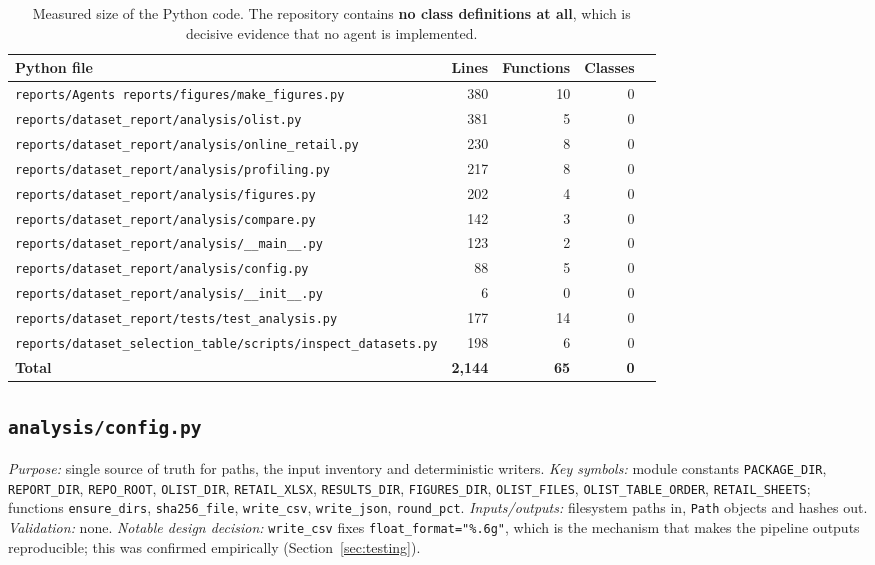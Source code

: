 \documentclass[11pt,a4paper]{article}
\newcommand{\code}[1]{\texttt{#1}}
\begin{document}
\begin{table}[H]
\centering
\small
\begin{tabular}{L{8.4cm}rrrr}
\toprule
\textbf{Python file} & \textbf{Lines} & \textbf{Functions} & \textbf{Classes} \\
\midrule
\code{reports/Agents reports/figures/make\_figures.py} & 380 & 10 & 0 \\
\code{reports/dataset\_report/analysis/olist.py} & 381 & 5 & 0 \\
\code{reports/dataset\_report/analysis/online\_retail.py} & 230 & 8 & 0 \\
\code{reports/dataset\_report/analysis/profiling.py} & 217 & 8 & 0 \\
\code{reports/dataset\_report/analysis/figures.py} & 202 & 4 & 0 \\
\code{reports/dataset\_report/analysis/compare.py} & 142 & 3 & 0 \\
\code{reports/dataset\_report/analysis/\_\_main\_\_.py} & 123 & 2 & 0 \\
\code{reports/dataset\_report/analysis/config.py} & 88 & 5 & 0 \\
\code{reports/dataset\_report/analysis/\_\_init\_\_.py} & 6 & 0 & 0 \\
\code{reports/dataset\_report/tests/test\_analysis.py} & 177 & 14 & 0 \\
\code{reports/dataset\_selection\_table/scripts/inspect\_datasets.py} & 198 & 6 & 0 \\
\midrule
\textbf{Total} & \textbf{2{,}144} & \textbf{65} & \textbf{0} \\
\bottomrule
\end{tabular}
\caption{Measured size of the Python code. The repository contains \textbf{no class definitions at all}, which is decisive evidence that no agent is implemented.}
\label{tab:inventory}
\end{table}

\subsection{\code{analysis/config.py}}
\textit{Purpose:} single source of truth for paths, the input inventory and deterministic writers. \textit{Key symbols:} module constants \code{PACKAGE\_DIR}, \code{REPORT\_DIR}, \code{REPO\_ROOT}, \code{OLIST\_DIR}, \code{RETAIL\_XLSX}, \code{RESULTS\_DIR}, \code{FIGURES\_DIR}, \code{OLIST\_FILES}, \code{OLIST\_TABLE\_ORDER}, \code{RETAIL\_SHEETS}; functions \code{ensure\_dirs}, \code{sha256\_file}, \code{write\_csv}, \code{write\_json}, \code{round\_pct}. \textit{Inputs/outputs:} filesystem paths in, \texttt{Path} objects and hashes out. \textit{Validation:} none. \textit{Notable design decision:} \code{write\_csv} fixes \code{float\_format="\%.6g"}, which is the mechanism that makes the pipeline outputs reproducible; this was confirmed empirically (Section~\ref{sec:testing}).
\end{document}
